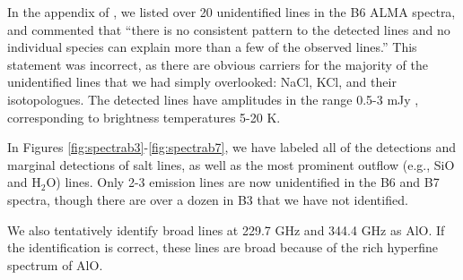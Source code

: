 \documentclass[twocolumn]{aastex62}
\begin{document}
In the appendix of \citet{Ginsburg2018b}, we listed over 20 unidentified 
lines in the B6 ALMA spectra, and commented that ``there is no
consistent pattern to the detected lines and no individual species can explain
more than a few of the observed lines.''  This statement was incorrect, as
there are obvious carriers for the majority of the unidentified lines that we
had simply overlooked: NaCl, KCl, and their isotopologues.  The
detected lines have amplitudes in the range 0.5-3 mJy \perbeam, corresponding
to brightness temperatures 5-20 K.  

In Figures \ref{fig:spectrab3}-\ref{fig:spectrab7}, we have labeled all of the
detections and marginal detections of salt lines, as well as the most prominent
outflow (e.g., SiO and H$_2$O) lines.  Only 2-3 emission lines are now
unidentified in the B6 and B7 spectra, though there are over a dozen in B3 that
we have not identified. 

We also tentatively identify broad lines at 229.7 GHz and 344.4 GHz as AlO.  If
the identification is correct, these lines are broad because of the rich
hyperfine spectrum of AlO.

%
\end{document}
